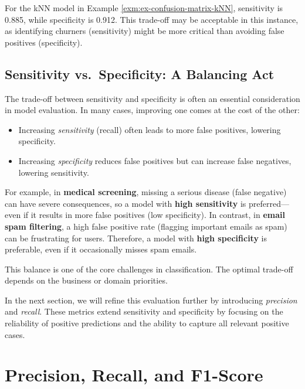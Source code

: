 \documentclass[
]{book}
\providecommand{\tightlist}{%
  \setlength{\itemsep}{0pt}\setlength{\parskip}{0pt}}
\theoremstyle{definition}
\theoremstyle{definition}
\theoremstyle{definition}
\theoremstyle{definition}
\theoremstyle{remark}
\begin{document}
For the kNN model in Example \ref{exm:ex-confusion-matrix-kNN}, sensitivity is 0.885, while specificity is 0.912. This trade-off may be acceptable in this instance, as identifying churners (sensitivity) might be more critical than avoiding false positives (specificity).

\subsection*{Sensitivity vs.~Specificity: A Balancing Act}\label{sensitivity-vs.-specificity-a-balancing-act}

The trade-off between sensitivity and specificity is often an essential consideration in model evaluation. In many cases, improving one comes at the cost of the other:

\begin{itemize}
\tightlist
\item
  Increasing \emph{sensitivity} (recall) often leads to more false positives, lowering specificity.
\item
  Increasing \emph{specificity} reduces false positives but can increase false negatives, lowering sensitivity.
\end{itemize}

For example, in \textbf{medical screening}, missing a serious disease (false negative) can have severe consequences, so a model with \textbf{high sensitivity} is preferred---even if it results in more false positives (low specificity). In contrast, in \textbf{email spam filtering}, a high false positive rate (flagging important emails as spam) can be frustrating for users. Therefore, a model with \textbf{high specificity} is preferable, even if it occasionally misses spam emails.

This balance is one of the core challenges in classification. The optimal trade-off depends on the business or domain priorities.

In the next section, we will refine this evaluation further by introducing \emph{precision} and \emph{recall}. These metrics extend sensitivity and specificity by focusing on the reliability of positive predictions and the ability to capture all relevant positive cases.

\section{Precision, Recall, and F1-Score}\label{precision-recall-and-f1-score}
\end{document}

